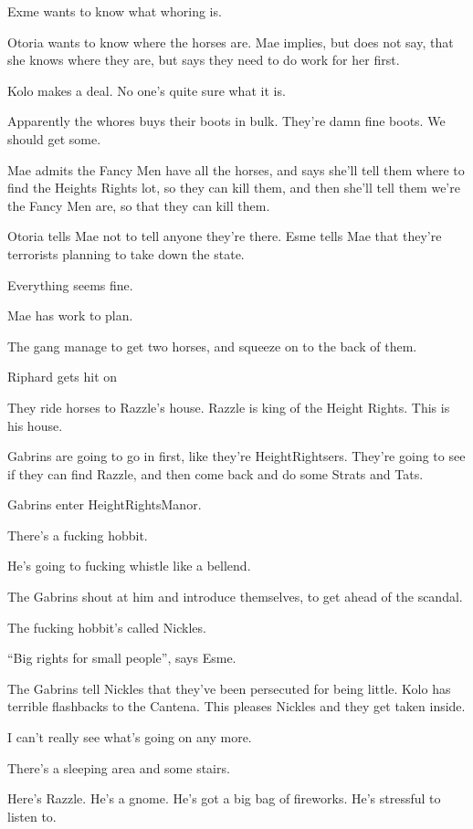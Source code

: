 Exme wants to know what whoring is.\medskip

Otoria wants to know where the horses are. Mae implies, but does not say, that she knows where they are, but says they need to do work for her first.\medskip

Kolo makes a deal. No one’s quite sure what it is.\medskip

Apparently the whores buys their boots in bulk. They’re damn fine boots. We should get some.\medskip

Mae admits the Fancy Men have all the horses, and says she’ll tell them where to find the Heights Rights lot, so they can kill them, and then she’ll tell them we’re the Fancy Men are, so that they can kill them.\medskip

Otoria tells Mae not to tell anyone they’re there. Esme tells Mae that they’re terrorists planning to take down the state.\medskip

Everything seems fine.\medskip

Mae has work to plan.\medskip

The gang manage to get two horses, and squeeze on to the back of them.\medskip

Riphard gets hit on\medskip

They ride horses to Razzle’s house. Razzle is king of the Height Rights. This is his house.\medskip

Gabrins are going to go in first, like they’re HeightRightsers. They’re going to see if they can find Razzle, and then come back and do some Strats and Tats.\medskip

Gabrins enter HeightRightsManor.\medskip

There’s a fucking hobbit.\medskip

He’s going to fucking whistle like a bellend.\medskip

The Gabrins shout at him and introduce themselves, to get ahead of the scandal.\medskip

The fucking hobbit’s called Nickles.\medskip

“Big rights for small people”, says Esme.\medskip

The Gabrins tell Nickles that they’ve been persecuted for being little. Kolo has terrible flashbacks to the Cantena. This pleases Nickles and they get taken inside.\medskip

I can’t really see what’s going on any more.\medskip

There’s a sleeping area and some stairs.\medskip

Here’s Razzle. He’s a gnome. He’s got a big bag of fireworks. He’s stressful to listen to.\medskip

